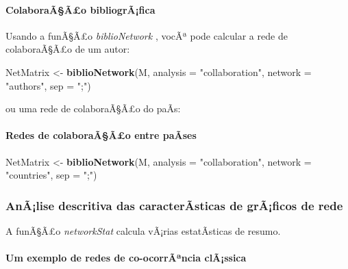\documentclass[]{article}
\newenvironment{Shaded}{\begin{snugshade}}{\end{snugshade}}
\newcommand{\KeywordTok}[1]{\textcolor[rgb]{0.13,0.29,0.53}{\textbf{#1}}}
\newcommand{\DataTypeTok}[1]{\textcolor[rgb]{0.13,0.29,0.53}{#1}}
\newcommand{\StringTok}[1]{\textcolor[rgb]{0.31,0.60,0.02}{#1}}
\newcommand{\NormalTok}[1]{#1}
\let\oldparagraph\paragraph
\renewcommand{\paragraph}[1]{\oldparagraph{#1}\mbox{}}
\begin{document}
\paragraph{ColaboraÃ§Ã£o
bibliogrÃ¡fica}\label{colaboraaao-bibliografica}

Usando a funÃ§Ã£o \emph{biblioNetwork} , vocÃª pode calcular a rede de
colaboraÃ§Ã£o de um autor:

\begin{Shaded}
\begin{Highlighting}[]
\NormalTok{NetMatrix <-}\StringTok{ }\KeywordTok{biblioNetwork}\NormalTok{(M, }\DataTypeTok{analysis =} \StringTok{"collaboration"}\NormalTok{, }\DataTypeTok{network =} \StringTok{"authors"}\NormalTok{, }\DataTypeTok{sep =} \StringTok{";"}\NormalTok{)}
\end{Highlighting}
\end{Shaded}

ou uma rede de colaboraÃ§Ã£o do paÃ­s:

\paragraph{Redes de colaboraÃ§Ã£o entre
paÃ­ses}\label{redes-de-colaboraaao-entre-paases}

\begin{Shaded}
\begin{Highlighting}[]
\NormalTok{NetMatrix <-}\StringTok{ }\KeywordTok{biblioNetwork}\NormalTok{(M, }\DataTypeTok{analysis =} \StringTok{"collaboration"}\NormalTok{, }\DataTypeTok{network =} \StringTok{"countries"}\NormalTok{, }\DataTypeTok{sep =} \StringTok{";"}\NormalTok{)}
\end{Highlighting}
\end{Shaded}

\subsubsection{AnÃ¡lise descritiva das caracterÃ­sticas de grÃ¡ficos de
rede}\label{analise-descritiva-das-caracterasticas-de-graficos-de-rede}

A funÃ§Ã£o \emph{networkStat} calcula vÃ¡rias estatÃ­sticas de resumo.

\paragraph{Um exemplo de redes de co-ocorrÃªncia
clÃ¡ssica}\label{um-exemplo-de-redes-de-co-ocorrancia-classica}
\end{document}
